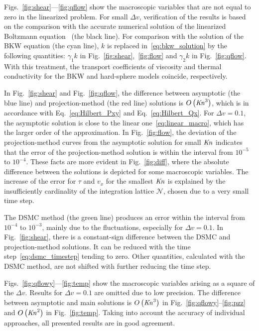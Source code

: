 \documentclass[]{jfm}
\newcommand{\Kn}{\mbox{\textit{Kn}}}
\newcommand{\Nu}{\mathcal{N}}
\newcommand{\OO}[1]{O\left(#1\right)}
\begin{document}
Figs.~\ref{fig:shear}---\ref{fig:qflow} show the macroscopic variables
that are not equal to zero in the linearized problem.
For small \(\Delta{v}\), verification of the results is based on the comparison with the accurate numerical solution
of the linearized Boltzmann equation~\citep{Ohwada1990} (the black line).
For comparison with the solution of the BKW equation (the cyan line),
\(k\) is replaced in~\eqref{eq:bkw_solution} by the following quantities:
\(\gamma_1k\) in Fig.~\ref{fig:shear},~\ref{fig:flow} and \(\gamma_2k\) in Fig.~\ref{fig:qflow}.
With this treatment, the transport coefficients of viscosity and thermal conductivity
for the BKW and hard-sphere models coincide, respectively.

In Fig.~\ref{fig:shear} and Fig.~\ref{fig:qflow}, the difference between asymptotic (the blue line)
and projection-method (the red line) solutions is \(\OO{\Kn^3}\),
which is in accordance with Eq.~\eqref{eq:Hilbert_Pxy} and Eq.~\eqref{eq:Hilbert_Qx}.
For \(\Delta{v}=0.1\), the asymptotic solution is close to the linear one~\eqref{eq:linear_macro},
which has the larger order of the approximation.
In Fig.~\ref{fig:flow}, the deviation of the projection-method curves
from the asymptotic solution for small \(\Kn\) indicates that
the error of the projection-method solution is within the interval from \(10^{-5}\) to \(10^{-4}\).
These facts are more evident in Fig.~\ref{fig:diff},
where the absolute difference between the solutions
is depicted for some macroscopic variables.
The increase of the error for \(\tau\) and \(v_x\) for the smallest \(\Kn\)
is explained by the insufficiently cardinality of the integration lattice \(\Nu\),
chosen due to a very small time step.

The DSMC method (the green line) produces an error within the interval from \(10^{-4}\) to \(10^{-3}\),
mainly due to the fluctuations, especially for \(\Delta{v}=0.1\).
In Fig.~\ref{fig:shear}, there is a constant-sign difference
between the DSMC and projection-method solutions.
It can be reduced with the time step~\eqref{eq:dsmc_timestep} tending to zero.
Other quantities, calculated with the DSMC method, are not shifted with
further reducing the time step.

Figs.~\ref{fig:qflowy}---\ref{fig:temp} show the macroscopic variables
arising as a square of the \(\Delta{v}\).
Results for \(\Delta{v}=0.1\) are omitted due to low precision.
The difference between asymptotic and main solutions
is \(\OO{\Kn^3}\) in Fig.~\ref{fig:qflowy}--\ref{fig:pzz} and \(\OO{\Kn^2}\) in Fig.~\ref{fig:temp}.
Taking into account the accuracy of individual approaches,
all presented results are in good agreement.
\end{document}
